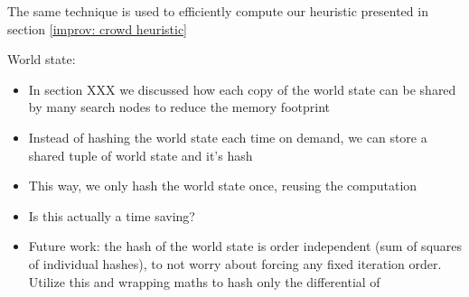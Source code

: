 The same technique is used to efficiently compute our heuristic presented in section \ref{improv: crowd heuristic}

World state:
\begin{itemize}
	\item In section XXX  we discussed how each copy of the world state can be shared by many search nodes to reduce the memory footprint
	\item Instead of hashing the world state each time on demand, we can store a shared tuple of world state and it's hash
	\item This way, we only hash the world state once, reusing the computation
	\item Is this actually a time saving?
	\item Future work: the hash of the world state is order independent (sum of squares of individual hashes), to not worry about forcing any fixed iteration order. Utilize this and wrapping maths to hash only the differential of 
\end{itemize}

